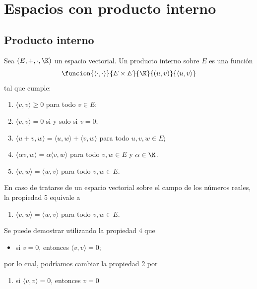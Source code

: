 \documentclass[compacto,10pt]{pubciencias-notas}
\begin{document}
\encabezado
\vspace*{-8mm}

\setcounter{section}{4}
\section{Espacios con producto interno}
\subsection{Producto interno}

\begin{defi}
    Sea $(E,+,\cdot,\K)$ un espacio vectorial. Un producto interno sobre $E$ es una función
    \[
        \funcion{\langle  \cdot, \cdot \rangle }{E\times E}{\K}{(u,v)}{\langle  u, v \rangle }
    \]
    tal que cumple:
    \begin{enumerate}
        \item 
            $\langle  v, v \rangle  \geq 0$ para todo $ v \in E$;
        \item 
            $\langle  v,v \rangle  = 0$ si y solo si $ v = 0$;
        \item 
            $\langle  u + v, w \rangle  = \langle  u,w \rangle  + \langle  v,w\rangle  $ para todo $u,v,w \in E$;
        \item
            $\langle  \alpha v,w \rangle  = \alpha \langle  v,w \rangle $ para todo $v,w \in E$ y $\alpha\in\K$.
        \item
            $\langle  v,w \rangle  = \overline{\langle w, v \rangle}$ para todo $v,w \in E$.
    \end{enumerate}
\end{defi}


\begin{advertencia}
    En caso de tratarse de un espacio vectorial sobre el campo de los números reales, la propiedad 5 equivale a
    \begin{enumerate}[start=5]
        \item
            $\langle  v,w \rangle  = \langle  w, v \rangle $ para todo $v,w \in E$.
    \end{enumerate}
\end{advertencia}


\begin{advertencia}
    Se puede demostrar utilizando la propiedad 4 que
    \begin{itemize}
        \item
            si $v = 0$, entonces $\langle  v,v \rangle  = 0$;
    \end{itemize}
    por lo cual, podríamos cambiar la propiedad 2 por
    \begin{enumerate}[start=2]
        \item
            si $\langle  v,v \rangle  = 0$, entonces $ v = 0$
    \end{enumerate}
\end{advertencia}
\end{document}
